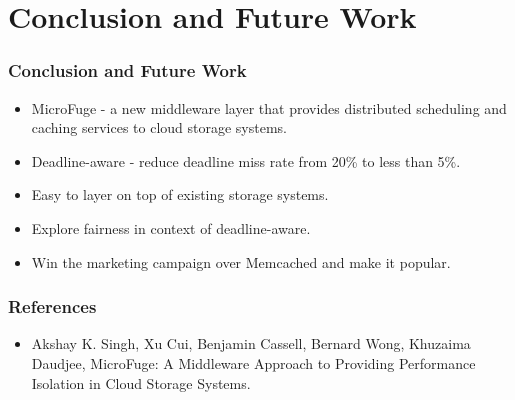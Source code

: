 \documentclass{beamer}
\begin{document}
\section*{Conclusion and Future Work}
\begin{frame}
\frametitle{Conclusion and Future Work}
\begin{itemize}
\item MicroFuge - a new middleware layer that provides distributed scheduling and caching services to cloud storage systems.
\item Deadline-aware - reduce deadline miss rate from 20\% to less than 5\%.
\item Easy to layer on top of existing storage systems.
\item Explore fairness in context of deadline-aware.
\item Win the marketing campaign over Memcached and make it popular.
\end{itemize}
\end{frame}



\begin{frame}
\frametitle{References}
\begin{itemize}
\item Akshay K. Singh, Xu Cui, Benjamin Cassell, Bernard Wong, Khuzaima Daudjee, MicroFuge: A Middleware Approach to Providing Performance Isolation in Cloud Storage Systems.
\end{itemize}
\end{frame}
\end{document}
